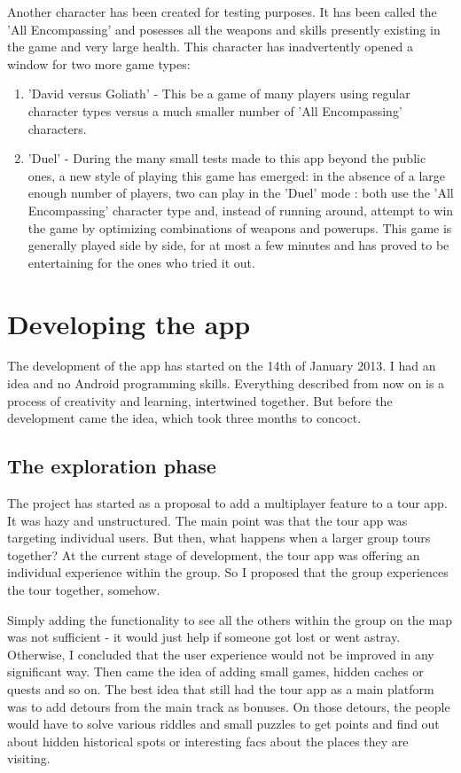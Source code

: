 \documentclass{article}
\begin{document}
Another character has been created for testing purposes. It has been called the
'All Encompassing' and posesses all the weapons and skills presently existing in
the game and very large health. This character has inadvertently opened a window
for two more game types: 
\begin{enumerate}
  \item 'David versus Goliath' - This be a game of many players using regular
  character types versus a much smaller number of 'All Encompassing' characters.
  \item 'Duel' - During the many small tests made to this app beyond the public
  ones, a new style of playing this game has emerged: in the absence of a large
  enough number of players, two can play in the 'Duel' mode : both use the 'All
  Encompassing' character type and, instead of running around, attempt to win
  the game by optimizing combinations of weapons and powerups. This game is
  generally played side by side, for at most a few minutes and has proved to be
  entertaining for the ones who tried it out.
\end{enumerate}

\section{Developing the app}

The development of the app has started on the 14th of January 2013. I had an
idea and no Android programming skills. Everything described from now on is a
process of creativity and learning, intertwined together. But before the
development came the idea, which took three months to concoct.\newline

\subsection{The exploration phase}

The project has started as a proposal to add a multiplayer feature to a tour
app. It was hazy and unstructured. The main point was that the tour app was
targeting individual users. But then, what happens when a larger group tours
together? At the current stage of development, the tour app was offering an
individual experience within the group. So I proposed that the group experiences
the tour together, somehow. \newline

Simply adding the functionality to see all the others within the group on the
map was not sufficient - it would just help if someone got lost or went astray.
Otherwise, I concluded that the user experience would not be improved in any
significant way. Then came the idea of adding small games, hidden caches or
quests and so on. The best idea that still had the tour app as a main platform
was to add detours from the main track as bonuses. On those detours, the people
would have to solve various riddles and small puzzles to get points and find out
about hidden historical spots or interesting facs about the places they are
visiting. \newline
\end{document}
